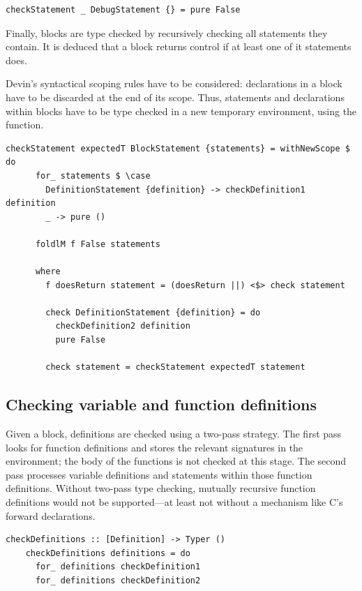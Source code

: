 \documentclass[UdineBachThesis,american,11pt,draft]{PhdThesis}
\begin{document}
  \begin{lstlisting}[gobble=4,basicstyle=\ttfamily\small]
    checkStatement _ DebugStatement {} = pure False
  \end{lstlisting}

  Finally, blocks are type checked by recursively checking all statements they
  contain. It is deduced that a block returns control if at least one of it
  statements does.

  Devin's syntactical scoping rules have to be considered: declarations in a
  block have to be discarded at the end of its scope. Thus, statements and
  declarations within blocks have to be type checked in a new temporary
  environment, using the \lstinline@withNewScope@ function.

  \begin{lstlisting}[gobble=4,basicstyle=\ttfamily\small]
    checkStatement expectedT BlockStatement {statements} = withNewScope $ do
      for_ statements $ \case
        DefinitionStatement {definition} -> checkDefinition1 definition
        _ -> pure ()

      foldlM f False statements

      where
        f doesReturn statement = (doesReturn ||) <$> check statement

        check DefinitionStatement {definition} = do
          checkDefinition2 definition
          pure False

        check statement = checkStatement expectedT statement
  \end{lstlisting}

  \subsection{Checking variable and function definitions}

  Given a block, definitions are checked using a two-pass strategy. The first
  pass looks for function definitions and stores the relevant signatures in the
  environment; the body of the functions is not checked at this stage. The
  second pass processes variable definitions and statements within those
  function definitions. Without two-pass type checking, mutually recursive
  function definitions would not be supported---at least not without a mechanism
  like C's forward declarations.

  \begin{lstlisting}[gobble=4,basicstyle=\ttfamily\small]
    checkDefinitions :: [Definition] -> Typer ()
    checkDefinitions definitions = do
      for_ definitions checkDefinition1
      for_ definitions checkDefinition2
  \end{lstlisting}
\end{document}
